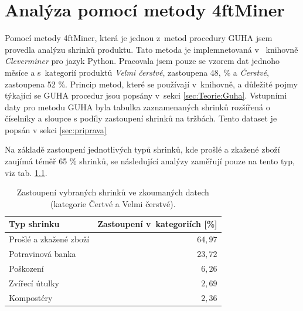 \chapter{Analýza pomocí metody 4ftMiner}
\label{ch:cleverminer}

Pomocí metody 4ftMiner, která je jednou z~metod procedury GUHA jsem provedla analýzu shrinků produktu. Tato metoda je implemnetovaná v~ knihovně \emph{Cleverminer} pro jazyk Python. Pracovala jsem pouze se vzorem dat jednoho měsíce a s~kategorií produktů \emph{Velmi čerstvé}, zastoupena 48, \% a \emph{Čerstvé}, zastoupena 52 \%. Princip metod, které se používají v~knihovně, a důležité pojmy týkající se GUHA procedur jsou popsány v~sekci \ref*{sec:Teorie:Guha}. Vstupními daty pro metodu GUHA byla tabulka zaznamenaných shrinků rozšířená o číselníky a sloupce s podíly zastoupení shrinků na tržbách. Tento dataset je popsán v sekci \ref{sec:priprava}


Na základě zastoupení jednotlivých typů shrinků, kde prošlé a zkažené zboží zaujímá téměř 65 \% shrinků, se následující analýzy zaměřují pouze na tento typ, viz tab. \ref*{tab:shrinkyZastoupeni}.

\begin{table}[hbtp!]
    \begin{center}
            \captionsetup{justification=centering}
    \caption{Zastoupení vybraných shrinků ve zkoumaných datech \\(kategorie Čertvé a Velmi čerstvé).}
    \begin{tabular}{l r}
        Typ shrinku & Zastoupení v~kategoriích [\%]\\
        \midrule
        Prošlé a zkažené zboží & $64{,}97$ \\
        Potravinová banka & $23{,}72$ \\
         Poškození & $6{,}26$ \\
        Zvířecí útulky & $2{,}69$ \\
        Kompostéry &  $2{,}36$ \\
        \end{tabular}
    \label{tab:shrinkyZastoupeni}
\end{center}
\end{table}

